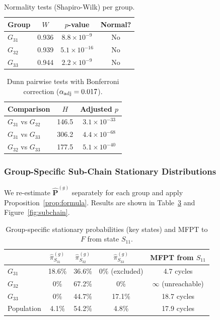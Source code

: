 \documentclass[12pt,a4paper]{article}
\newcommand{\mat}[1]{\mathbf{#1}}
\begin{document}
\begin{table}[ht]
\centering
\caption{Normality tests (Shapiro-Wilk) per group.}
\label{tab:normality}
\begin{tabular}{lccc}
\toprule
\textbf{Group} & $W$ & $p$-value & Normal? \\
\midrule
$G_{31}$ & 0.936 & $8.8\times10^{-9}$  & No \\
$G_{32}$ & 0.939 & $5.1\times10^{-16}$ & No \\
$G_{33}$ & 0.944 & $2.2\times10^{-9}$  & No \\
\bottomrule
\end{tabular}
\end{table}

\begin{table}[ht]
\centering
\caption{Dunn pairwise tests with Bonferroni correction ($\alpha_{\rm adj} = 0.017$).}
\label{tab:dunn}
\begin{tabular}{lcc}
\toprule
\textbf{Comparison} & $H$ & Adjusted $p$ \\
\midrule
$G_{31}$ vs $G_{32}$ & 146.5 & $3.1 \times 10^{-33}$ \\
$G_{31}$ vs $G_{33}$ & 306.2 & $4.4 \times 10^{-68}$ \\
$G_{32}$ vs $G_{33}$ & 177.5 & $5.1 \times 10^{-40}$ \\
\bottomrule
\end{tabular}
\end{table}

\subsubsection{Group-Specific Sub-Chain Stationary Distributions}

We re-estimate $\hat{\mat{P}}^{(g)}$ separately for each group and apply
Proposition~\ref{prop:formula}.  Results are shown in Table~\ref{tab:subchain}
and Figure~\ref{fig:subchain}.

\begin{table}[ht]
\centering
\caption{Group-specific stationary probabilities (key states) and MFPT to $F$
         from state $S_{11}$.}
\label{tab:subchain}
\begin{tabular}{l ccc c}
\toprule
 & $\hat{\pi}^{(g)}_{S_{31}}$ & $\hat{\pi}^{(g)}_{S_{32}}$ & $\hat{\pi}^{(g)}_{S_{33}}$
 & \textbf{MFPT from $S_{11}$} \\
\midrule
$G_{31}$ & 18.6\% & 36.6\% & 0\% (excluded) & 4.7 cycles \\
$G_{32}$ & 0\%    & 67.2\% & 0\%            & $\infty$ (unreachable) \\
$G_{33}$ & 0\%    & 44.7\% & 17.1\%         & 18.7 cycles \\
\midrule
Population & 4.1\% & 54.2\% & 4.8\%         & 17.9 cycles \\
\bottomrule
\end{tabular}
\end{table}
\end{document}

